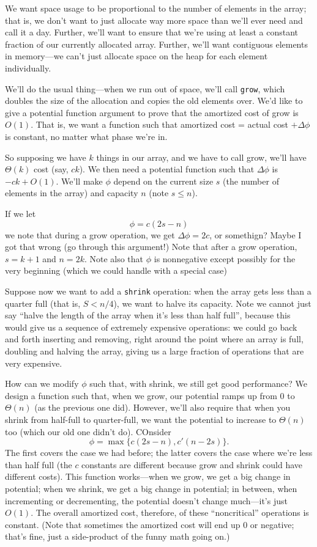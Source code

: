 \documentclass{article}
\begin{document}
We want space usage to be proportional to the number of elements in the array;
that is, we don't want to just allocate way more space than we'll ever need
and call it a day.
Further, we'll want to ensure that we're using at least a constant
fraction of our currently allocated array.
Further, we'll want contiguous elements in memory---we can't just 
allocate space on the heap for each element individually.

We'll do the usual thing---when we run out of space, we'll call \texttt{grow},
which doubles the size of the allocation and copies the old elements over.
We'd like to give a potential function argument to prove that the
amortized cost of grow is $O(1)$.
That is, we want a function such that amortized cost = actual cost 
$+ \Delta\phi$
is constant, no matter what phase we're in.

So supposing we have $k$ things in our array, and we have to call grow,
we'll have $\Theta(k)$ cost (say, $ck$).
We then need a potential function such that $\Delta \phi$ is $-ck + O(1)$.
We'll make $\phi$ depend on the current size $s$ (the number of elements
in the array) and capacity $n$ (note $s\leq n$).

If we let
$$
\phi = c( 2s-n)
$$
we note that during a grow operation, we get $\Delta\phi = 2c$, 
or somethign? Maybe I got that wrong (go through this argument!)
Note that after a grow operation, $s=k+1$ and $n=2k$.
Note also that $\phi$ is nonnegative except possibly for the very beginning
(which we could handle with a special case)


Suppose now we want to add a \texttt{shrink} operation: when the
array gets less than a quarter full (that is, $S < n/4$), we want to halve its capacity.
Note we cannot just say ``halve the length of the array when it's less than
half full'', because this would give us a sequence
of extremely expensive operations: we could go back and forth inserting and
removing, right around the point where an array is full, doubling
and halving the array, giving us a large fraction of operations that are
very expensive.

How can we modify $\phi$ such that, with shrink, we still get good performance?
We design a function such that, when we grow, our potential ramps up from
$0$ to $\Theta(n)$ (as the previous one did).
However, we'll also require that when you shrink from half-full to quarter-full,
we want the potential to increase to $\Theta(n)$ too (which our old one didn't
do).
COnsider
$$
\phi = \max\{
	c(2s - n), c'(n - 2s)
\}.
$$
The first covers the case we had before; the latter covers the case
where we're less than half full (the $c$ constants are different because
grow and shrink could have different costs).
This function works---when we grow, we get a big change in potential; when
we shrink, we get a big change in potential; in between, when incrementing
or decrementing, the potential doesn't change much---it's just $O(1)$.
The overall amortized cost, therefore, of these ``noncritical'' operations
is constant.
(Note that sometimes the amortized cost will end up 0 or negative; that's 
fine, just a side-product of the funny math going on.)
\end{document}
